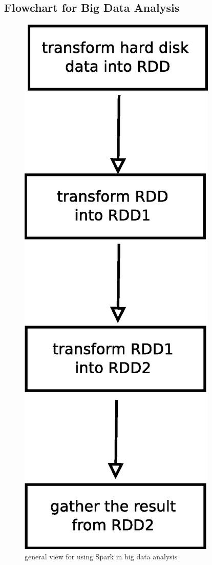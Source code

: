 \documentclass[notheorems, aspectratio=54]{beamer}
\begin{document}

\subsection{Flowchart for Big Data Analysis}
\begin{frame}

 \begin{figure}
 \includegraphics[scale=0.3]{rdd2}
\caption{general view for using Spark in big data analysis}
\end{figure} 

\end{frame}
\end{document}
